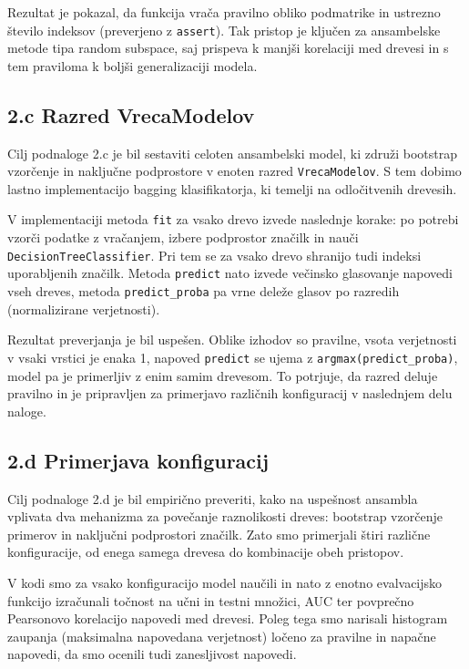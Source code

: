 \documentclass[12pt,a4paper]{article}
\begin{document}
Rezultat je pokazal, da funkcija vrača pravilno obliko podmatrike in ustrezno število indeksov (preverjeno z \texttt{assert}). Tak pristop je ključen za ansambelske metode tipa random subspace, saj prispeva k manjši korelaciji med drevesi in s tem praviloma k boljši generalizaciji modela.

\subsection*{2.c Razred VrecaModelov}
Cilj podnaloge 2.c je bil sestaviti celoten ansambelski model, ki združi bootstrap vzorčenje in naključne podprostore v enoten razred \texttt{VrecaModelov}. S tem dobimo lastno implementacijo bagging klasifikatorja, ki temelji na odločitvenih drevesih.

V implementaciji metoda \texttt{fit} za vsako drevo izvede naslednje korake: po potrebi vzorči podatke z vračanjem, izbere podprostor značilk in nauči \texttt{DecisionTreeClassifier}. Pri tem se za vsako drevo shranijo tudi indeksi uporabljenih značilk. Metoda \texttt{predict} nato izvede večinsko glasovanje napovedi vseh dreves, metoda \texttt{predict\_proba} pa vrne deleže glasov po razredih (normalizirane verjetnosti).

Rezultat preverjanja je bil uspešen. Oblike izhodov so pravilne, vsota verjetnosti v vsaki vrstici je enaka 1, napoved \texttt{predict} se ujema z \texttt{argmax(predict\_proba)}, model pa je primerljiv z enim samim drevesom. To potrjuje, da razred deluje pravilno in je pripravljen za primerjavo različnih konfiguracij v naslednjem delu naloge.

\subsection*{2.d Primerjava konfiguracij}
Cilj podnaloge 2.d je bil empirično preveriti, kako na uspešnost ansambla vplivata dva mehanizma za povečanje raznolikosti dreves: bootstrap vzorčenje primerov in naključni podprostori značilk. Zato smo primerjali štiri različne konfiguracije, od enega samega drevesa do kombinacije obeh pristopov.

V kodi smo za vsako konfiguracijo model naučili in nato z enotno evalvacijsko funkcijo izračunali točnost na učni in testni množici, AUC ter povprečno Pearsonovo korelacijo napovedi med drevesi. Poleg tega smo narisali histogram zaupanja (maksimalna napovedana verjetnost) ločeno za pravilne in napačne napovedi, da smo ocenili tudi zanesljivost napovedi.
\end{document}
